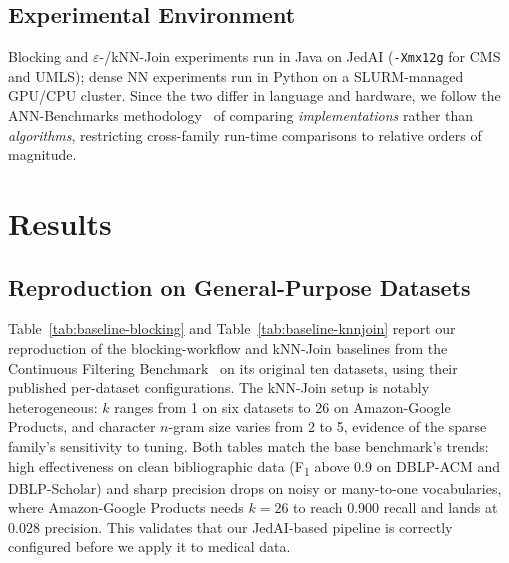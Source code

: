 \documentclass[runningheads]{llncs}
\begin{document}
\subsection{Experimental Environment}
Blocking and $\varepsilon$-/kNN-Join experiments run in Java on JedAI (\texttt{-Xmx12g} for
CMS and UMLS); dense NN experiments run in Python on a SLURM-managed GPU/CPU cluster. Since
the two differ in language and hardware, we follow the ANN-Benchmarks
methodology~\cite{aumuller2020annbenchmarks} of comparing \textit{implementations} rather than \textit{algorithms}, restricting cross-family run-time comparisons to relative orders of magnitude.


\section{Results}
\label{sec:results}

\subsection{Reproduction on General-Purpose Datasets}
\label{sec:results-reproduction}

Table~\ref{tab:baseline-blocking} and Table~\ref{tab:baseline-knnjoin} report our reproduction
of the blocking-workflow and kNN-Join baselines from the Continuous Filtering
Benchmark~\cite{papadakis2023benchmarking,neuhof2024open} on its original ten datasets, using
their published per-dataset configurations. The kNN-Join setup is notably heterogeneous: $k$
ranges from 1 on six datasets to 26 on Amazon-Google Products, and character $n$-gram size
varies from 2 to 5, evidence of the sparse family's sensitivity to tuning. Both tables match
the base benchmark's trends: high effectiveness on clean bibliographic data (F\textsubscript{1}
above 0.9 on DBLP-ACM and DBLP-Scholar) and sharp precision drops on noisy or many-to-one
vocabularies, where Amazon-Google Products needs $k=26$ to reach 0.900 recall and lands at
0.028 precision. This validates that our JedAI-based pipeline is correctly configured before
we apply it to medical data.
\end{document}

